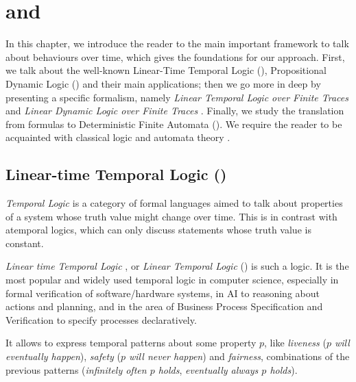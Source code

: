\chapter{\LTLf and \LDLf}
\label{ch:logic}

In this chapter, we introduce the reader to the main important framework to talk about behaviours over time, which gives the foundations for our approach.
First, we talk about the well-known Linear-Time Temporal Logic (\LTL), Propositional Dynamic Logic (\PDL) and their main applications; then we go more in deep by presenting a specific formalism, namely \emph{Linear Temporal Logic over Finite Traces} \LTLf and \emph{Linear Dynamic Logic over Finite Traces} \LDLf. Finally, we study the translation from \LLf formulas to Deterministic Finite Automata (\DFA).
We require the reader to be acquainted with classical logic \citep{sep-logic-classical} and automata theory \citep{Hopcroft:2000:IAT:557657}.
\section{Linear-time Temporal Logic (\LTL)}\label{sect:ltl}
\emph{Temporal Logic} \citep{sep-logic-temporal} is a category of formal languages aimed to talk about properties of a system whose truth value might change over time. This is in contrast with atemporal logics, which can only discuss statements whose truth value is constant. 

\emph{Linear time Temporal Logic} \citep{Pnueli:1977:TLP:1382431.1382534}, or \emph{Linear Temporal Logic} (\LTL) is such a logic. It is the most popular and widely used temporal logic in computer science, especially in formal verification of software/hardware systems, in AI to reasoning about actions and planning, and in the area of Business Process Specification and Verification to specify processes declaratively.

It allows to express temporal patterns about some property $p$, like \emph{liveness} (\emph{$p$ will eventually happen}), \emph{safety} (\emph{$p$ will never happen}) and \emph{fairness}, combinations of the previous patterns (\emph{infinitely often $p$ holds}, \emph{eventually always $p$ holds}).

